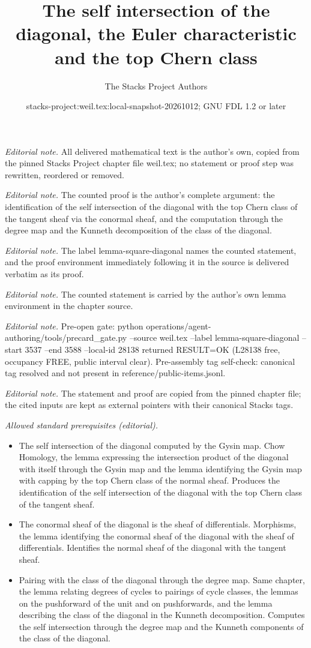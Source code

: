 \documentclass[10pt,a4paper]{amsart}
\title{The self intersection of the diagonal, the Euler characteristic and the top Chern class}
\author{The Stacks Project Authors}
\date{stacks-project:weil.tex:local-snapshot-20261012; GNU FDL 1.2 or later}
\theoremstyle{plain}
\theoremstyle{definition}
\theoremstyle{remark}
\numberwithin{equation}{subsection}
\begin{document}
\maketitle
\noindent\textit{Editorial note.} All delivered mathematical text is the author's own, copied from the pinned Stacks Project chapter file weil.tex; no statement or proof step was rewritten, reordered or removed.\par\medskip
\noindent\textit{Editorial note.} The counted proof is the author's complete argument: the identification of the self intersection of the diagonal with the top Chern class of the tangent sheaf via the conormal sheaf, and the computation through the degree map and the Kunneth decomposition of the class of the diagonal.\par\medskip
\noindent\textit{Editorial note.} The label lemma-square-diagonal names the counted statement, and the proof environment immediately following it in the source is delivered verbatim as its proof.\par\medskip
\noindent\textit{Editorial note.} The counted statement is carried by the author's own lemma environment in the chapter source.\par\medskip
\noindent\textit{Editorial note.} Pre-open gate: python operations/agent-authoring/tools/precard\_gate.py --source weil.tex --label lemma-square-diagonal --start 3537 --end 3588 --local-id 28138 returned RESULT=OK (L28138 free, occupancy FREE, public interval clear). Pre-assembly tag self-check: canonical tag resolved and not present in reference/public-items.jsonl.\par\medskip
\noindent\textit{Editorial note.} The statement and proof are copied from the pinned chapter file; the cited inputs are kept as external pointers with their canonical Stacks tags.\par\medskip
\noindent\textit{Allowed standard prerequisites (editorial).}\begin{itemize}
\item The self intersection of the diagonal computed by the Gysin map. Chow Homology, the lemma expressing the intersection product of the diagonal with itself through the Gysin map and the lemma identifying the Gysin map with capping by the top Chern class of the normal sheaf. Produces the identification of the self intersection of the diagonal with the top Chern class of the tangent sheaf.
\item The conormal sheaf of the diagonal is the sheaf of differentials. Morphisms, the lemma identifying the conormal sheaf of the diagonal with the sheaf of differentials. Identifies the normal sheaf of the diagonal with the tangent sheaf.
\item Pairing with the class of the diagonal through the degree map. Same chapter, the lemma relating degrees of cycles to pairings of cycle classes, the lemmas on the pushforward of the unit and on pushforwards, and the lemma describing the class of the diagonal in the Kunneth decomposition. Computes the self intersection through the degree map and the Kunneth components of the class of the diagonal.
\end{itemize}\medskip
\end{document}
